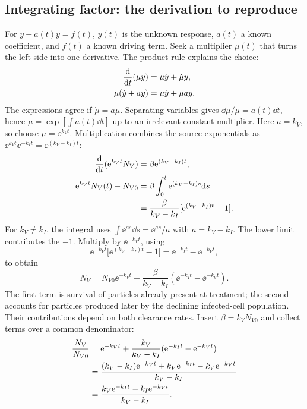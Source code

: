 \subsection{Integrating factor: the derivation to reproduce}\label{subsec:integrating-factor}
For $\dot y+a(t)y=f(t)$, $y(t)$ is the unknown response, $a(t)$ a known coefficient, and $f(t)$ a known driving term. Seek a multiplier $\mu(t)$ that turns the left side into one derivative. The product rule explains the choice:
\begin{align}
\frac{\mathrm{d}}{\mathrm{d} t}(\mu y)&=\mu\dot y+\dot\mu y,\notag\\
\mu(\dot y+ay)&=\mu\dot y+\mu ay.\label{eq:integrating-factor-choice}
\end{align}
The expressions agree if $\dot\mu=a\mu$. Separating variables gives $\dd\mu/\mu=a(t)\dd t$, hence $\mu=\exp[\int a(t)\dd t]$ up to an irrelevant constant multiplier. Here $a=k_V$, so choose $\mu=\ee^{k_Vt}$. Multiplication combines the source exponentials as $\ee^{k_Vt}\ee^{-k_It}=\ee^{(k_V-k_I)t}$:
\begin{align}
\frac{\mathrm{d}}{\mathrm{d} t}(\mathrm{e}^{k_Vt}N_V)&=\beta\mathrm{e}^{(k_V-k_I)t},\label{eq:product-rule}\\
\mathrm{e}^{k_Vt}N_V(t)-N_{V0}
&=\beta\int_0^t\mathrm{e}^{(k_V-k_I)s}\mathrm{d} s\notag\\
&=\frac{\beta}{k_V-k_I}[\mathrm{e}^{(k_V-k_I)t}-1].\label{eq:integrating-factor-integral}
\end{align}
For $k_V\ne k_I$, the integral uses $\int\ee^{as}\dd s=\ee^{as}/a$ with $a=k_V-k_I$. The lower limit contributes the $-1$. Multiply by $\ee^{-k_Vt}$, using
\begin{equation}\label{eq:viral-exponential-algebra}
\ee^{-k_Vt}\bigl[\ee^{(k_V-k_I)t}-1\bigr]
=\ee^{-k_It}-\ee^{-k_Vt},
\end{equation}
to obtain
\begin{equation}\label{eq:viral-general-solution}
\boxed{N_V=N_{V0}\ee^{-k_Vt}
+\frac{\beta}{k_V-k_I}(\ee^{-k_It}-\ee^{-k_Vt}).}
\end{equation}
The first term is survival of particles already present at treatment; the second accounts for particles produced later by the declining infected-cell population. Their contributions depend on both clearance rates. Insert $\beta=k_VN_{V0}$ and collect terms over a common denominator:
\begin{align}
\frac{N_V}{N_{V0}}
&=\mathrm{e}^{-k_Vt}+\frac{k_V}{k_V-k_I}(\mathrm{e}^{-k_It}-\mathrm{e}^{-k_Vt})\notag\\
&=\frac{(k_V-k_I)\mathrm{e}^{-k_Vt}+k_V\mathrm{e}^{-k_It}-k_V\mathrm{e}^{-k_Vt}}{k_V-k_I}\notag\\
&=\frac{k_V\mathrm{e}^{-k_It}-k_I\mathrm{e}^{-k_Vt}}{k_V-k_I}.\label{eq:viral-steady-algebra}
\end{align}
